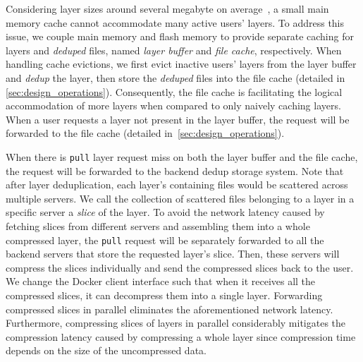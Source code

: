Considering layer sizes around several megabyte on average~\cite{dockerworkload}, 
a small main memory cache cannot accommodate many active users' layers.
To address this issue, we couple main memory and flash memory to provide separate caching for layers and \emph{deduped} files, named \emph{layer buffer} and \emph{file cache}, respectively.
When handling cache evictions, we first evict inactive users' layers from the layer buffer and \emph{dedup} the layer, then store the \emph{deduped} files into the file cache (detailed in \cref{sec:design_operations}). 
Consequently, the file cache is facilitating the logical accommodation of more layers when compared to only naively caching layers.
When a user requests a layer not present in the layer buffer, the request will be forwarded to the file cache (detailed in~\cref{sec:design_operations}). 

When there is \texttt{pull} layer request miss on both the layer buffer and the file cache, the request will be forwarded to the backend dedup storage system.
Note that after layer deduplication, each layer's containing files would be scattered across multiple servers. 
We call the collection of scattered files belonging to a layer in a specific server a \emph{slice} of the layer.
To avoid the network latency caused by fetching slices from different servers and assembling them into a whole compressed layer,
the \texttt{pull} request will be separately forwarded to all the backend servers that store the requested layer's slice. 
Then, these servers will compress the slices individually and send the compressed slices back to the user.
We change the Docker client interface such that when it receives all the compressed slices, it can decompress them into a single layer.
Forwarding compressed slices in parallel eliminates the aforementioned network latency. 
Furthermore, compressing slices of layers in parallel considerably mitigates the compression latency caused by compressing a whole layer since compression time depends on the size of the uncompressed data.





 

